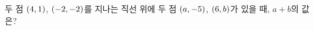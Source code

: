 두 점 $(4{,}\mkern3mu\mathopen{}1)$, $(-2{,}\mkern3mu\mathopen{}-2)$를 지나는 직선 위에 두 점 $(a{,}\mkern3mu\mathopen{}-5)$, $(6{,}\mkern3mu\mathopen{}b)$가 있을 때, $a+b$의 값은?
